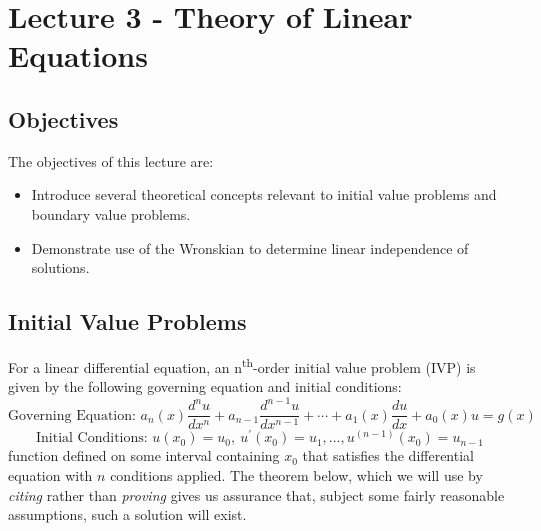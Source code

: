 \chapter{Lecture 3 - Theory of Linear Equations}
\label{ch:lec3}
\section{Objectives}
The objectives of this lecture are:
\begin{itemize}
\item Introduce several theoretical concepts relevant to initial value problems and boundary value problems.
\item Demonstrate use of the Wronskian to determine linear independence of solutions.
\end{itemize}

\section{Initial Value Problems}

For a linear differential equation, an n\textsuperscript{th}-order initial value problem (IVP) is given by the following governing equation and initial conditions:
\begin{equation}
\text{Governing Equation: }a_n(x)\frac{d^n u}{dx^n}+a_{n-1}\frac{d^{n-1}u}{dx^{n-1}}+\cdots+a_1(x)\frac{du}{dx}+a_0(x)u=g(x)
\label{eq:ivp-ge}
\end{equation}
\begin{equation}
\text{Initial Conditions: }u(x_0)=u_0, \ u^{\prime}(x_0)=u_1,\dots,u^{(n-1)}(x_0)=u_{n-1}
\label{eq:ivp-ics}
\end{equation}
\noindent {} function defined on some interval containing $x_0$ that satisfies the differential equation with $n$ conditions applied. The theorem below, which we will use by \emph{citing} rather than \emph{proving} gives us assurance that, subject some fairly reasonable assumptions, such a solution will exist.  

